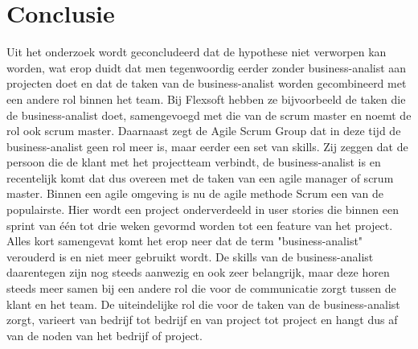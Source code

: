 \documentclass{hogent-article}
\begin{document}
\section{Conclusie}
Uit het onderzoek wordt geconcludeerd dat de hypothese niet verworpen kan worden, wat erop duidt dat men tegenwoordig eerder zonder business-analist aan projecten doet en dat de taken van de business-analist worden gecombineerd met een andere rol binnen het team.\newline \newline
Bij Flexsoft hebben ze bijvoorbeeld de taken die de business-analist doet, samengevoegd met die van de scrum master en noemt de rol ook scrum master. \newline
Daarnaast zegt de Agile Scrum Group dat in deze tijd de business-analist geen rol meer is, maar eerder een set van skills. Zij zeggen dat de persoon die de klant met het projectteam verbindt, de business-analist is en recentelijk komt dat dus overeen met de taken van een agile manager of scrum master. \newline \newline
Binnen een agile omgeving is nu de agile methode Scrum een van de populairste. Hier wordt een project onderverdeeld in user stories die binnen een sprint van één tot drie weken gevormd worden tot een feature van het project. \newline \newline
Alles kort samengevat komt het erop neer dat de term "business-analist" verouderd is en niet meer gebruikt wordt. De skills van de business-analist daarentegen zijn nog steeds aanwezig en ook zeer belangrijk, maar deze horen steeds meer samen bij een andere rol die voor de communicatie zorgt tussen de klant en het team. De uiteindelijke rol die voor de taken van de business-analist zorgt, varieert van bedrijf tot bedrijf en van project tot project en hangt dus af van de noden van het bedrijf of project.



\printbibliography
\end{document}
